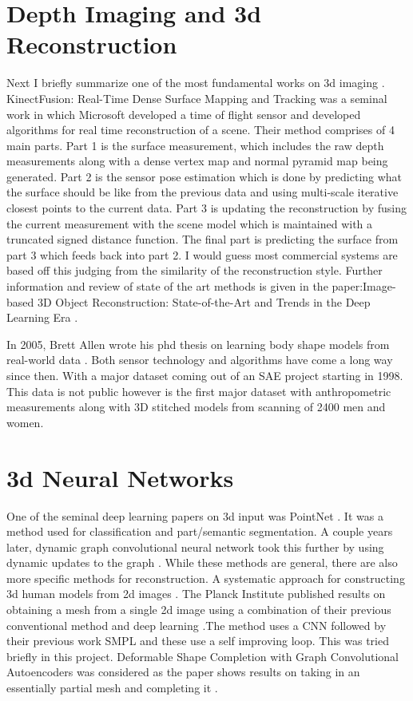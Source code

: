 \section{Depth Imaging and 3d Reconstruction}

Next I briefly summarize one of the most fundamental works on 3d imaging \cite{izadi2011kinectfusion}. KinectFusion: Real-Time Dense Surface Mapping and Tracking was a seminal work in which Microsoft developed a time of flight sensor and developed algorithms for real time reconstruction of a scene. Their method comprises of 4 main parts. Part 1 is the surface measurement, which includes the raw depth measurements along with a dense vertex map and normal pyramid map being generated. Part 2 is the sensor pose estimation which is done by predicting what the surface should be like from the previous data and using multi-scale iterative closest points to the current data. Part 3 is updating the reconstruction by fusing the current measurement with the scene model which is maintained with a truncated signed distance function. The final part is predicting the surface from part 3 which feeds back into part 2. I would guess most commercial systems are based off this judging from the similarity of the reconstruction style.
Further information and review of state of the art methods is given in the paper:Image-based 3D Object Reconstruction: State-of-the-Art and Trends in the Deep Learning Era \cite{DBLP:journals/corr/abs-1906-06543}.

In 2005, Brett Allen wrote his phd thesis on learning body shape models from real-world data \cite{allen2005learning}. Both sensor technology and algorithms have come a long way since then. With a major dataset coming out of an SAE project starting in 1998. This data is not public however is the first major dataset with anthropometric measurements along with 3D stitched models from scanning of 2400 men and women.

\section{3d Neural Networks}
One of the seminal deep learning papers on 3d input was PointNet \cite{DBLP:journals/corr/QiSMG16}. It was a method used for classification and part/semantic segmentation. A couple years later, dynamic graph convolutional neural network took this further by using dynamic updates to the graph \cite{DBLP:journals/corr/abs-1801-07829}. While these methods are general, there are also more specific methods for reconstruction. A systematic approach for constructing 3d human models from 2d images \cite{5645897}. The Planck Institute published results on obtaining a mesh from a single 2d image using a combination of their previous conventional method and deep learning \cite{kolotouros2019learning}.The method uses a CNN followed by their previous work SMPL and these use a self improving loop. This was tried briefly in this project. Deformable Shape Completion with Graph Convolutional Autoencoders was considered as the paper shows results on taking in an essentially partial mesh and completing it \cite{litany2018deformable}. 

